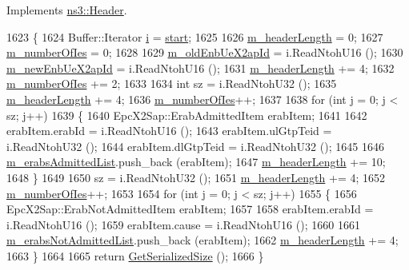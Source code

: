 Implements \hyperlink{classns3_1_1Header_a78be9400bb66b2a8543606f395ef5396}{ns3\+::\+Header}.


\begin{DoxyCode}
1623 \{
1624   Buffer::Iterator \hyperlink{bernuolliDistribution_8m_a6f6ccfcf58b31cb6412107d9d5281426}{i} = \hyperlink{namespacevisualizer_1_1core_a2a35e5d8a34af358b508dac8635754e0}{start};
1625 
1626   \hyperlink{classns3_1_1EpcX2HandoverRequestAckHeader_a238a652363fc3bf3de12c440cb4bb133}{m\_headerLength} = 0;
1627   \hyperlink{classns3_1_1EpcX2HandoverRequestAckHeader_a72e576e9e4f0e3a390b03b091c16bc37}{m\_numberOfIes} = 0;
1628 
1629   \hyperlink{classns3_1_1EpcX2HandoverRequestAckHeader_a5a92dccc1ba92cab6e24c3ee08c3f418}{m\_oldEnbUeX2apId} = i.ReadNtohU16 ();
1630   \hyperlink{classns3_1_1EpcX2HandoverRequestAckHeader_a6a743b8acf6351e7a8a63d361888793a}{m\_newEnbUeX2apId} = i.ReadNtohU16 ();
1631   \hyperlink{classns3_1_1EpcX2HandoverRequestAckHeader_a238a652363fc3bf3de12c440cb4bb133}{m\_headerLength} += 4;
1632   \hyperlink{classns3_1_1EpcX2HandoverRequestAckHeader_a72e576e9e4f0e3a390b03b091c16bc37}{m\_numberOfIes} += 2;
1633 
1634   \textcolor{keywordtype}{int} sz = i.ReadNtohU32 ();
1635   \hyperlink{classns3_1_1EpcX2HandoverRequestAckHeader_a238a652363fc3bf3de12c440cb4bb133}{m\_headerLength} += 4;
1636   \hyperlink{classns3_1_1EpcX2HandoverRequestAckHeader_a72e576e9e4f0e3a390b03b091c16bc37}{m\_numberOfIes}++;
1637 
1638   \textcolor{keywordflow}{for} (\textcolor{keywordtype}{int} j = 0; j < sz; j++)
1639     \{
1640       EpcX2Sap::ErabAdmittedItem erabItem;
1641 
1642       erabItem.erabId = i.ReadNtohU16 ();
1643       erabItem.ulGtpTeid = i.ReadNtohU32 ();
1644       erabItem.dlGtpTeid = i.ReadNtohU32 ();
1645 
1646       \hyperlink{classns3_1_1EpcX2HandoverRequestAckHeader_aae103cf49fa679625cf673810ecb29e6}{m\_erabsAdmittedList}.push\_back (erabItem);
1647       \hyperlink{classns3_1_1EpcX2HandoverRequestAckHeader_a238a652363fc3bf3de12c440cb4bb133}{m\_headerLength} += 10;
1648     \}
1649 
1650   sz = i.ReadNtohU32 ();
1651   \hyperlink{classns3_1_1EpcX2HandoverRequestAckHeader_a238a652363fc3bf3de12c440cb4bb133}{m\_headerLength} += 4;
1652   \hyperlink{classns3_1_1EpcX2HandoverRequestAckHeader_a72e576e9e4f0e3a390b03b091c16bc37}{m\_numberOfIes}++;
1653 
1654   \textcolor{keywordflow}{for} (\textcolor{keywordtype}{int} j = 0; j < sz; j++)
1655     \{
1656       EpcX2Sap::ErabNotAdmittedItem erabItem;
1657 
1658       erabItem.erabId = i.ReadNtohU16 ();
1659       erabItem.cause  = i.ReadNtohU16 ();
1660 
1661       \hyperlink{classns3_1_1EpcX2HandoverRequestAckHeader_abe32eccfe9ba3a6abde04f72bfb32b8b}{m\_erabsNotAdmittedList}.push\_back (erabItem);
1662       \hyperlink{classns3_1_1EpcX2HandoverRequestAckHeader_a238a652363fc3bf3de12c440cb4bb133}{m\_headerLength} += 4;
1663     \}
1664 
1665   \textcolor{keywordflow}{return} \hyperlink{classns3_1_1EpcX2HandoverRequestAckHeader_af114c3564ad6c3ae34ed22ff2fafe77d}{GetSerializedSize} ();
1666 \}
\end{DoxyCode}


